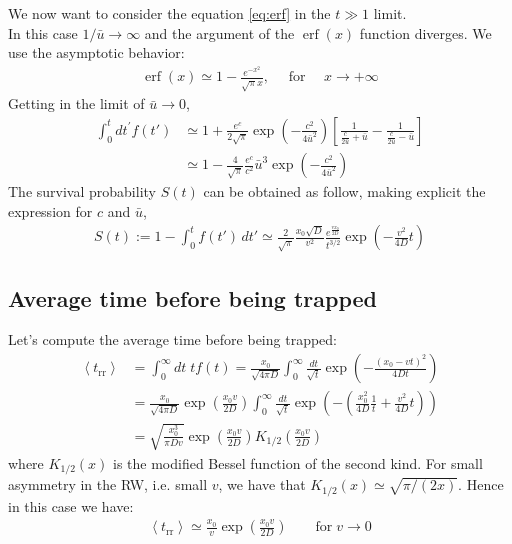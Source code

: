 \documentclass[4apaper,11pt,fleqn]{article}
\theoremstyle{remark}
\theoremstyle{definition}
\begin{document}
We now want to consider the equation \eqref{eq:erf} in the $t \gg 1$ limit.\\
In this case $1/\bar{u}\rightarrow \infty$ and the argument of the $\operatorname{erf}(x)$ function diverges. We use the asymptotic behavior:
\begin{align*}
  \operatorname{erf}(x) \simeq 1-\frac{e^{-x^{2}}}{\sqrt{\pi} x}, \quad \text { for } \quad x \rightarrow+\infty
\end{align*}
Getting in the limit of $\bar{u} \rightarrow 0$,
\begin{align*}
 \int_{0}^{t} d t^{\prime} f(t') & \simeq 1+\frac{e^{c}}{2 \sqrt{\pi}} \exp \left(-\frac{c^{2}}{4 \bar{u}^{2}}\right)\left[\frac{1}{\frac{c}{2 \bar{u}}+\bar{u}}-\frac{1}{\frac{c}{2 \bar{u}}-\bar{u}}\right] \\ & \simeq 1-\frac{4}{\sqrt{\pi}} \frac{e^{c}}{c^{2}} \bar{u}^{3} \exp \left(-\frac{c^{2}}{4 \bar{u}^{2}}\right)
\end{align*}
The survival probability $S(t)$ can be obtained as follow, making explicit the expression for $c$ and $\bar{u}$,
\begin{align*}
  S(t) := 1- \int_0^t f(t') \, dt' \simeq \frac{2}{\sqrt{\pi}} \frac{x_{0} \sqrt{D}}{v^{2}} \frac{e^{\frac{v x_{0}}{2 D}}}{t^{3 / 2}} \exp \left(-\frac{v^{2}}{4 D} t\right)
\end{align*}

\subsection{Average time before being trapped}
\label{sebsec:t_trapp}
Let's compute the average time before being trapped:
\begin{align*}
  \left\langle t_{\mathrm{rr}}\right\rangle &=\int_{0}^{\infty} dt\; t f(t)=\frac{x_{0}}{\sqrt{4 \pi D}} \int_{0}^{\infty} \frac{d t}{\sqrt{t}} \exp \left(-\frac{\left(x_{0}-v t\right)^{2}}{4 D t}\right) \\ &=\frac{x_{0}}{\sqrt{4 \pi D}} \exp \left(\frac{x_{0} v}{2 D}\right) \int_{0}^{\infty} \frac{d t}{\sqrt{t}} \exp \left(-\left(\frac{x_{0}^{2}}{4 D} \frac{1}{t}+\frac{v^{2}}{4 D} t\right)\right) \\ &=\sqrt{\frac{x_{0}^{3}}{\pi D v}} \exp \left(\frac{x_{0} v}{2 D}\right) K_{1 / 2}\left(\frac{x_{0} v}{2 D}\right)
\end{align*}
where $K_{1 / 2}(x)$ is the modified Bessel function of the second kind.
For small asymmetry in the RW, i.e. small $v$, we have that $K_{1/2}(x) \simeq \sqrt{\pi/(2x)}$. Hence in this case we have:
\begin{align}
  \label{eq:trr}
  \boxed{\left\langle t_{\mathrm{rr}}\right\rangle \simeq \frac{x_0}{v} \exp \left( \frac{x_0v}{2D} \right)} \qquad \text{for} \; v \rightarrow 0
\end{align}
\end{document}
